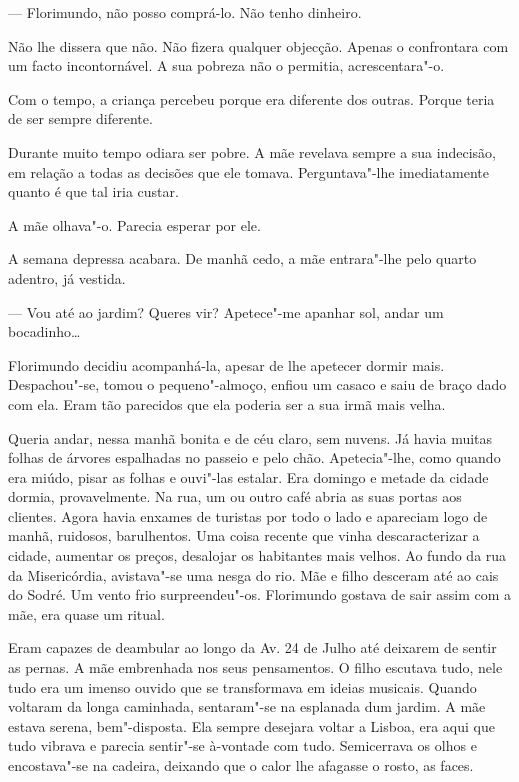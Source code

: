 --- Florimundo, não posso comprá-lo. Não tenho dinheiro.

Não lhe dissera que não. Não fizera qualquer objecção. Apenas o
confrontara com um facto incontornável. A sua pobreza não o permitia,
acrescentara"-o.

Com o tempo, a criança percebeu porque era diferente dos outras. Porque
teria de ser sempre diferente.

Durante muito tempo odiara ser pobre. A mãe revelava sempre a sua
indecisão, em relação a todas as decisões que ele tomava. Perguntava"-lhe
imediatamente quanto é que tal iria custar.

A mãe olhava"-o. Parecia esperar por ele.

A semana depressa acabara. De manhã cedo, a mãe entrara"-lhe pelo quarto
adentro, já vestida.

--- Vou até ao jardim? Queres vir? Apetece"-me apanhar sol, andar um
bocadinho\ldots{}

Florimundo decidiu acompanhá-la, apesar de lhe apetecer dormir mais.
Despachou"-se, tomou o pequeno"-almoço, enfiou um casaco e saiu de braço
dado com ela. Eram tão parecidos que ela poderia ser a sua irmã mais
velha.

Queria andar, nessa manhã bonita e de céu claro, sem nuvens. Já havia
muitas folhas de árvores espalhadas no passeio e pelo chão.
Apetecia"-lhe, como quando era miúdo, pisar as folhas e ouvi"-las estalar.
Era domingo e metade da cidade dormia, provavelmente. Na rua, um ou
outro café abria as suas portas aos clientes. Agora havia enxames de
turistas por todo o lado e apareciam logo de manhã, ruidosos,
barulhentos. Uma coisa recente que vinha descaracterizar a cidade,
aumentar os preços, desalojar os habitantes mais velhos. Ao fundo da rua
da Misericórdia, avistava"-se uma nesga do rio. Mãe e filho desceram até
ao cais do Sodré. Um vento frio surpreendeu"-os. Florimundo gostava de
sair assim com a mãe, era quase um ritual.

Eram capazes de deambular ao longo da Av. 24 de Julho até deixarem de
sentir as pernas. A mãe embrenhada nos seus pensamentos. O filho
escutava tudo, nele tudo era um imenso ouvido que se transformava em
ideias musicais. Quando voltaram da longa caminhada, sentaram"-se na
esplanada dum jardim. A mãe estava serena, bem"-disposta. Ela sempre
desejara voltar a Lisboa, era aqui que tudo vibrava e parecia sentir"-se
à-vontade com tudo. Semicerrava os olhos e encostava"-se na cadeira,
deixando que o calor lhe afagasse o rosto, as faces.

